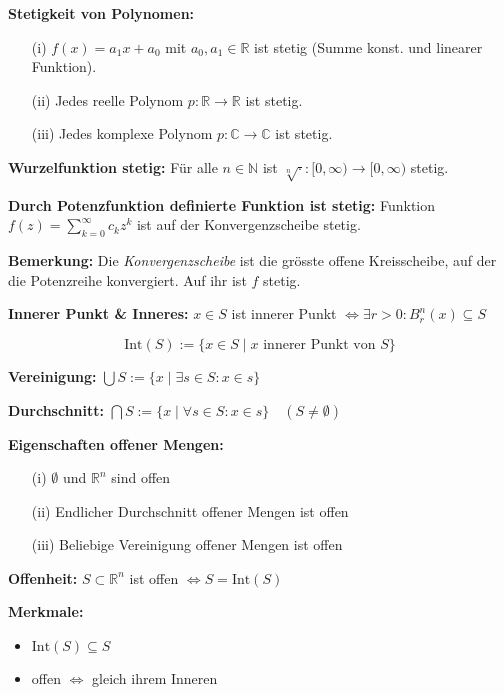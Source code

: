 \textbf{Stetigkeit von Polynomen:}
\begin{itemize}
  \item[(i)] \(f(x) = a_1 x + a_0\) mit \(a_0,a_1 \in \mathbb{R}\) ist stetig (Summe konst. und linearer Funktion).
  \item[(ii)] Jedes reelle Polynom \(p: \mathbb{R} \to \mathbb{R}\) ist stetig.
  \item[(iii)] Jedes komplexe Polynom \(p: \mathbb{C} \to \mathbb{C}\) ist stetig.
\end{itemize}

\textbf{Wurzelfunktion stetig:}  
Für alle \(n \in \mathbb{N}\) ist \(\sqrt[n]{\cdot} : [0,\infty) \to [0,\infty)\) stetig.

\textbf{Durch Potenzfunktion definierte Funktion ist stetig:}  
Funktion \(f(z) = \sum_{k=0}^\infty c_k z^k\) ist auf der Konvergenzscheibe stetig.

\textbf{Bemerkung:}  
Die \textit{Konvergenzscheibe} ist die grösste offene Kreisscheibe, auf der die Potenzreihe konvergiert. Auf ihr ist \(f\) stetig.

\textbf{Innerer Punkt \& Inneres:}  
\(x \in S\) ist innerer Punkt \(\Leftrightarrow \exists r>0: B_r^n(x) \subseteq S\)

\[
\text{Int}(S) := \{x \in S \mid x \text{ innerer Punkt von } S\}
\]

\textbf{Vereinigung:} \(\displaystyle \bigcup S := \{x \mid \exists s \in S: x \in s\}\)

\textbf{Durchschnitt:} \(\displaystyle \bigcap S := \{x \mid \forall s \in S: x \in s\}\quad (S \ne \emptyset)\)


\textbf{Eigenschaften offener Mengen:}
\begin{itemize}
  \item[(i)] \(\emptyset\) und \(\mathbb{R}^n\) sind offen
  \item[(ii)] Endlicher Durchschnitt offener Mengen ist offen
  \item[(iii)] Beliebige Vereinigung offener Mengen ist offen
\end{itemize}


\textbf{Offenheit:}  
\(S \subset \mathbb{R}^n\) ist offen \(\Leftrightarrow S = \text{Int}(S)\)

\textbf{Merkmale:}
\begin{itemize}
  \item \(\text{Int}(S) \subseteq S\)
  \item offen \(\Leftrightarrow\) gleich ihrem Inneren
\end{itemize}

